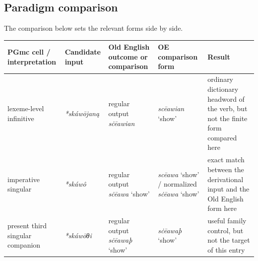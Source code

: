 \documentclass[
  british,
  a4paper,
  openany]{book}
\newcounter{none} %
\begin{document}
\subsection{Paradigm comparison}\label{paradigm-comparison-26}

The comparison below sets the relevant forms side by side.

{\def\LTcaptype{none} %
\begin{longtable}[]{@{}
  >{\raggedright\arraybackslash}p{}
  >{\raggedright\arraybackslash}p{}
  >{\raggedright\arraybackslash}p{}
  >{\raggedright\arraybackslash}p{}
  >{\raggedright\arraybackslash}p{}@{}}
\toprule\noalign{}
\begin{minipage}[b]{\linewidth}\raggedright
PGmc cell / interpretation
\end{minipage} & \begin{minipage}[b]{\linewidth}\raggedright
Candidate input
\end{minipage} & \begin{minipage}[b]{\linewidth}\raggedright
Old English outcome or comparison
\end{minipage} & \begin{minipage}[b]{\linewidth}\raggedright
OE comparison form
\end{minipage} & \begin{minipage}[b]{\linewidth}\raggedright
Result
\end{minipage} \\
\midrule\noalign{}
\endhead
\bottomrule\noalign{}
\endlastfoot
lexeme-level infinitive & {\emph{*skáwōjaną}} & regular output
{\emph{sċēawian}} & {\emph{scēawian}} `show' & ordinary dictionary
headword of the verb, but not the finite form compared here \\
imperative singular & {\emph{*skáwô}} & regular output {\emph{sċēawa}}
`show' & {\emph{scēawa}} `show' / normalized {\emph{sċēawa}} `show' &
exact match between the derivational input and the Old English form
here \\
present third singular companion & {\emph{*skáwōθi}} & regular output
{\emph{sċēawaþ}} `show' & {\emph{sċēawaþ}} `show' & useful family
control, but not the target of this entry \\
\end{longtable}
}
\end{document}
